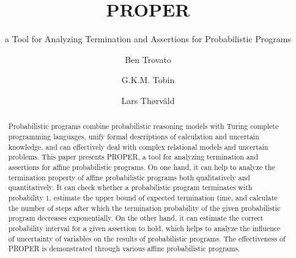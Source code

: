 \documentclass[sigconf,review, anonymous]{acmart}
\begin{document}
\title{PROPER}
\subtitle{a Tool for Analyzing Termination and Assertions for Probabilistic Programs}


\author{Ben Trovato}

\author{G.K.M. Tobin}

\author{Lars Th{\o}rv{\"a}ld}

\renewcommand{\shortauthors}{B. Trovato et al.}


\begin{abstract}
  Probabilistic programs combine probabilistic reasoning models with Turing complete programming languages, unify formal descriptions of calculation and uncertain knowledge, and can effectively deal with complex relational models and uncertain problems. This paper presents PROPER, a tool for analyzing termination and assertions for affine probabilistic programs. On one hand, it can help to analyze the termination property of affine probabilistic programs both qualitatively and quantitatively. It can check whether a probabilistic program terminates with probability $1$, estimate the upper bound of expected termination time, and calculate the number of steps after which the termination probability of the given probabilistic program decreases exponentially.  On the other hand, it can estimate the correct probability interval for a given assertion to hold, which helps to analyze the influence of uncertainty of variables on the results of probabilistic programs.
  The effectiveness of PROPER is demonstrated through various affine probabilistic programs.
\end{abstract}
\end{document}
